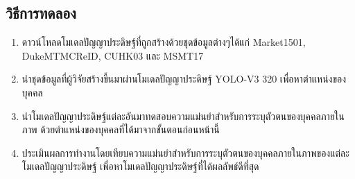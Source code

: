 \subsection*{วิธีการทดลอง}
	\begin{enumerate}
		\setlength\itemsep{-0.25em}
		\item ดาวน์โหลดโมเดลปัญญาประดิษฐ์ที่ถูกสร้างด้วยชุดข้อมูลต่างๆได้แก่ Market1501, DukeMTMCReID, CUHK03 และ MSMT17
		\item นำชุดข้อมูลที่ผู้วิจัยสร้างขึ้นมาผ่านโมเดลปัญญาประดิษฐ์ YOLO-V3 320 เพื่อหาตำแหน่งของบุคคล
		\item นำโมเดลปัญญาประดิษฐ์แต่ละอันมาทดสอบความแม่นยำสำหรับการระบุตัวตนของบุคคลภายในภาพ ด้วยตำแหน่งของบุคคลที่ได้มาจากขั้นตอนก่อนหน้านี้
		\item ประเมินผลการทำงานโดยเทียบความแม่นยำสำหรับการระบุตัวตนของบุคคลภายในภาพของแต่ละโมเดลปัญญาประดิษฐ์ เพื่อหาโมเดลปัญญาประดิษฐ์ที่ได้ผลลัพธ์ดีที่สุด
\end{enumerate}
